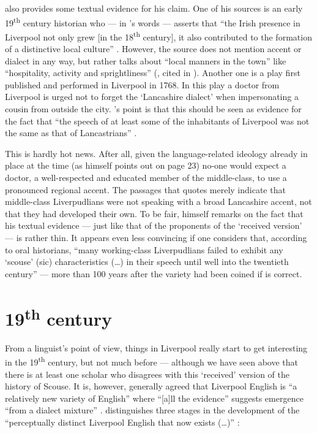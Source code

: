\citeauthor{crowley2012} also provides some textual evidence for his claim. One of his sources is an early 19\textsuperscript{th} century historian who --- in \citeauthor{crowley2012}'s words --- asserts that ``the Irish presence in Liverpool not only grew [in the 18\textsuperscript{th} century], it also contributed to the formation of a distinctive local culture'' \citeyearpar[30]{crowley2012}.
However, the source does not mention accent or dialect in any way, but rather talks about ``local manners in the town'' like ``hospitality, activity and sprightliness'' (\citealt{troughton1810}, cited in \citealt[30]{crowley2012}).
Another one is a play first published and performed in Liverpool in 1768.
In this play a doctor from Liverpool is urged not to forget the `Lancashire dialect' when impersonating a cousin from outside the city.
\citeauthor{crowley2012}'s point is that this should be seen as evidence for the fact that ``the speech of at least some of the inhabitants of Liverpool was not the same as that of Lancastrians'' \cite[cf.][32--35]{crowley2012}.

This is hardly hot news.
After all, given the language-related ideology already in place at the time (as \citeauthor{crowley2012} himself points out on page 23) no-one would expect a doctor, a well-respected and educated member of the middle-class, to use a pronounced regional accent.
The passages that \citeauthor{crowley2012} quotes merely indicate that middle-class Liverpudlians were not speaking with a broad Lancashire accent, not that they had developed their own.
To be fair, \citeauthor{crowley2012} himself remarks on the fact that his textual evidence --- just like that of the proponents of the `received version' --- is rather thin.
It appears even less convincing if one considers that, according to oral historians, ``many working-class Liverpudlians failed to exhibit any `scouse' (sic) characteristics (\ldots) in their speech until well into the twentieth century''  \citep[43--44]{belchem2006d} --- more than 100 years after the variety had been coined if \citeauthor{crowley2012} is correct.


	\section{19\textsuperscript{th} century}\label{sec.hist.19}

From a linguist's point of view, things in Liverpool really start to get interesting in the 19\textsuperscript{th} century, but not much before --- although we have seen above that there is at least one scholar who disagrees with this `received' version of the history of Scouse.
It is, however, generally agreed that Liverpool English is ``a relatively new variety of English'' where ``[a]ll the evidence'' suggests emergence ``from a dialect mixture'' \citep[113 and 121]{honeybone2007}.
\citeauthor{honeybone2007} distinguishes three stages in the development of the ``perceptually distinct Liverpool English that now exists (\dots)'' \citeyearpar[119]{honeybone2007}:

